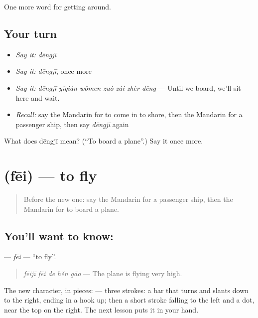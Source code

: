 \begin{grammarlens}[title={What you've built}]
One more word for getting around.
\end{grammarlens}

\subsection*{Your turn}
\begin{itemize}
\raggedright
  \item \emph{Say it:} \emph{dēngjī}
  \item \emph{Say it:} \emph{dēngjī}, once more
  \item \emph{Say it:} \emph{dēngjī yǐqián wǒmen zuò zài zhèr děng} — Until we board, we'll sit here and wait.
  \item \emph{Recall:} say the Mandarin for to come in to shore, then the Mandarin for a passenger ship, then say \emph{dēngjī} again
\end{itemize}

\begin{tcolorbox}[breakable,colback=teal!4,colframe=teal!35!black,title={Before you move on}]
What does dēngjī mean? (\textquotedblleft{}To board a plane\textquotedblright{}.) Say it once more.
\end{tcolorbox}
\section[\texorpdfstring{\zh{飞} (fēi)}{飞 (fēi)}]{ (fēi) — to fly}

\label{lesson:ZH-C413-fei}



\begin{quote}
Before the new one: say the Mandarin for a passenger ship, then the Mandarin for to board a plane.
\end{quote}

\subsection*{You'll want to know: }
\textbf{} — \emph{fēi} — \textquotedblleft{}to fly\textquotedblright{}.

\begin{quote}
\textbf{} \emph{fēijī fēi de hěn gāo} — The plane is flying very high.
\end{quote}

The new character, in pieces:  — three strokes: a bar that turns and slants down to the right, ending in a hook up; then a short stroke falling to the left and a dot, near the top on the right. The next lesson puts it in your hand.


